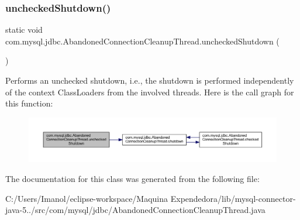 \subsubsection{\texorpdfstring{unchecked\+Shutdown()}{uncheckedShutdown()}}
{\footnotesize\ttfamily static void com.\+mysql.\+jdbc.\+Abandoned\+Connection\+Cleanup\+Thread.\+unchecked\+Shutdown (\begin{DoxyParamCaption}{ }\end{DoxyParamCaption})\hspace{0.3cm}{\ttfamily [static]}}

Performs an unchecked shutdown, i.\+e., the shutdown is performed independently of the context Class\+Loaders from the involved threads. Here is the call graph for this function\+:\nopagebreak
\begin{figure}[H]
\begin{center}
\leavevmode
\includegraphics[width=350pt]{classcom_1_1mysql_1_1jdbc_1_1_abandoned_connection_cleanup_thread_abf43aba7ad8fa551a194474046c02235_cgraph}
\end{center}
\end{figure}


The documentation for this class was generated from the following file\+:\begin{DoxyCompactItemize}
\item 
C\+:/\+Users/\+Imanol/eclipse-\/workspace/\+Maquina Expendedora/lib/mysql-\/connector-\/java-\/5../src/com/mysql/jdbc/Abandoned\+Connection\+Cleanup\+Thread.\+java\end{DoxyCompactItemize}
